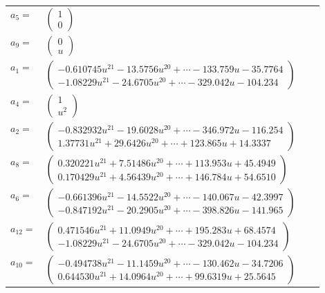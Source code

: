 \documentclass[1p]{elsarticle_modified}
\theoremstyle{definition}
\begin{document}
\begin{tabular}{m{7pt} m{180pt} m{7pt} m{180pt} }
\flushright $a_{5}=$&$\begin{pmatrix}1\\0\end{pmatrix}$ \\
\flushright $a_{9}=$&$\begin{pmatrix}0\\u\end{pmatrix}$ \\
\flushright $a_{1}=$&$\begin{pmatrix}-0.610745 u^{21}-13.5756 u^{20}+\cdots-133.759 u-35.7764\\-1.08229 u^{21}-24.6705 u^{20}+\cdots-329.042 u-104.234\end{pmatrix}$ \\
\flushright $a_{4}=$&$\begin{pmatrix}1\\u^2\end{pmatrix}$ \\
\flushright $a_{2}=$&$\begin{pmatrix}-0.832932 u^{21}-19.6028 u^{20}+\cdots-346.972 u-116.254\\1.37731 u^{21}+29.6426 u^{20}+\cdots+123.865 u+14.3337\end{pmatrix}$ \\
\flushright $a_{8}=$&$\begin{pmatrix}0.320221 u^{21}+7.51486 u^{20}+\cdots+113.953 u+45.4949\\0.170429 u^{21}+4.56439 u^{20}+\cdots+146.784 u+54.6510\end{pmatrix}$ \\
\flushright $a_{6}=$&$\begin{pmatrix}-0.661396 u^{21}-14.5522 u^{20}+\cdots-140.067 u-42.3997\\-0.847192 u^{21}-20.2905 u^{20}+\cdots-398.826 u-141.965\end{pmatrix}$ \\
\flushright $a_{12}=$&$\begin{pmatrix}0.471546 u^{21}+11.0949 u^{20}+\cdots+195.283 u+68.4574\\-1.08229 u^{21}-24.6705 u^{20}+\cdots-329.042 u-104.234\end{pmatrix}$ \\
\flushright $a_{10}=$&$\begin{pmatrix}-0.494738 u^{21}-11.1459 u^{20}+\cdots-130.462 u-34.7206\\0.644530 u^{21}+14.0964 u^{20}+\cdots+99.6319 u+25.5645\end{pmatrix}$ \\

\end{tabular}
\end{document}
